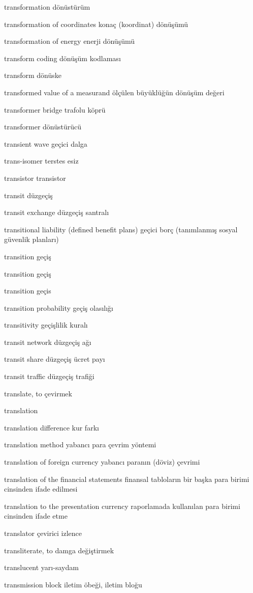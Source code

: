\documentclass[12pt,fleqn]{article}\usepackage{../../common}
\begin{document}
transformation dönüstürüm

transformation of coordinates konaç (koordinat) dönüşümü

transformation of energy enerji dönüşümü

transform coding dönüşüm kodlaması

transform dönüske

transformed value of a measurand ölçülen büyüklüğün dönüşüm değeri

transformer bridge trafolu köprü

transformer dönüstürücü

transient wave geçici dalga

trans-isomer terstes esiz

transistor transistor

transit düzgeçiş

transit exchange düzgeçiş santralı

transitional liability (defined benefit plans) geçici borç (tanımlanmış sosyal güvenlik planları)

transition geçiş

transition geçiş

transition geçis

transition probability geçiş olasılığı

transitivity geçişlilik kuralı

transit network düzgeçiş ağı

transit share düzgeçiş ücret payı

transit traffic düzgeçiş trafiği

translate, to çevirmek

translation

translation difference kur farkı

translation method yabancı para çevrim yöntemi

translation of foreign currency yabancı paranın (döviz) çevrimi

translation of the financial statements finansal tabloların bir başka para birimi cinsinden ifade edilmesi

translation to the presentation currency raporlamada kullanılan para birimi cinsinden ifade etme

translator çevirici izlence

transliterate, to damga değiştirmek

translucent yarı-saydam

transmission block iletim öbeği, iletim bloğu
\end{document}
